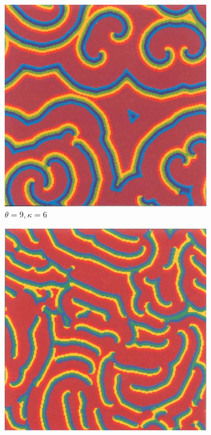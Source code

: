 \begin{figure}[h!]
	\begin{subfigure}{0.45\linewidth}
		\includegraphics[width=\linewidth]{gh3}
		\caption{$\theta=9,\kappa=6$}
		\label{fig:gh1c}
	\end{subfigure}\hfill
	\begin{subfigure}{0.45\linewidth}
		\includegraphics[width=\linewidth]{gh4}

\end{subfigure}
\end{figure}
